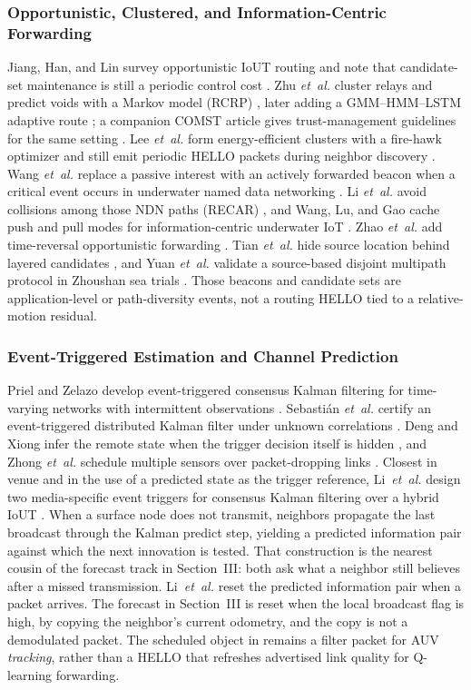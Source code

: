 \subsubsection{Opportunistic, Clustered, and Information-Centric Forwarding}
Jiang, Han, and Lin survey opportunistic IoUT routing and note that
candidate-set maintenance is still a periodic control cost
\cite{jiang2023orsurvey}.
Zhu \emph{et~al.} cluster relays and predict voids with a Markov
model (RCRP) \cite{zhu2024rcrp}, later adding a GMM--HMM--LSTM
adaptive route \cite{zhu2024gmmhmm}; a companion COMST article
gives trust-management guidelines for the same setting
\cite{zhu2024trustcomst}.
Lee \emph{et~al.} form energy-efficient clusters with a fire-hawk
optimizer and still emit periodic HELLO packets during neighbor
discovery \cite{lee2025fho}.
Wang \emph{et~al.} replace a passive interest with an actively
forwarded beacon when a critical event occurs in underwater named
data networking \cite{wang2024push}.
Li \emph{et~al.} avoid collisions among those NDN paths (RECAR)
\cite{li2024recar}, and Wang, Lu, and Gao cache push and pull
modes for information-centric underwater IoT
\cite{wang2025reliable}.
Zhao \emph{et~al.} add time-reversal opportunistic forwarding
\cite{zhao2026trclor}.
Tian \emph{et~al.} hide source location behind layered candidates
\cite{tian2023lslpr}, and Yuan \emph{et~al.} validate a
source-based disjoint multipath protocol in Zhoushan sea trials
\cite{yuan2024multipath}.
Those beacons and candidate sets are application-level or
path-diversity events, not a routing HELLO tied to a
relative-motion residual.

\subsubsection{Event-Triggered Estimation and Channel Prediction}
Priel and Zelazo develop event-triggered consensus Kalman filtering
for time-varying networks with intermittent observations
\cite{priel2023consensus}.
Sebasti\'{a}n \emph{et~al.} certify an event-triggered distributed
Kalman filter under unknown correlations \cite{sebastian2024eco}.
Deng and Xiong infer the remote state when the trigger decision
itself is hidden \cite{deng2023auto,deng2024lcsys}, and Zhong
\emph{et~al.} schedule multiple sensors over packet-dropping links
\cite{zhong2024tsp}.
Closest in venue and in the use of a predicted state as the trigger
reference, Li~\emph{et~al.} design two media-specific event triggers
for consensus Kalman filtering over a hybrid IoUT
\cite{li2026dse}.
When a surface node does not transmit, neighbors propagate the last
broadcast through the Kalman predict step, yielding a predicted
information pair against which the next innovation is tested.
That construction is the nearest cousin of the forecast track in
Section~III: both ask what a neighbor still believes after a missed
transmission.
Li~\emph{et~al.} reset the predicted information pair when a packet
arrives.
The forecast in Section~III is reset when the local broadcast flag
is high, by copying the neighbor's current odometry, and the copy is
not a demodulated packet.
The scheduled object in \cite{li2026dse} remains a filter packet for
AUV \emph{tracking}, rather than a HELLO that refreshes advertised
link quality for Q-learning forwarding.

